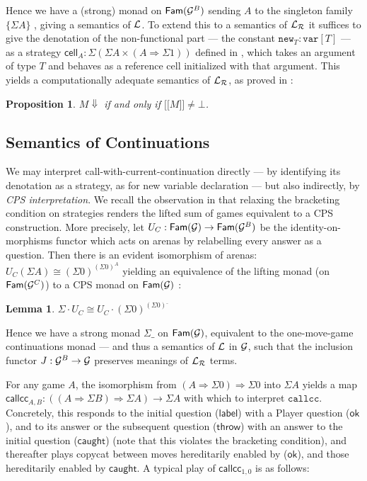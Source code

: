 \documentclass{eptcs}
\def\[{\ensuremath{[ \! [}}
\def\]{\ensuremath{] \! ]}}
\def\G{{\cal{G}}}
\def\L{{\cal{L}}}
\def\0{0}
\def\1m{\iota}
\def\1{1}
\newcommand{\lbl}{{\mathsf{label}}}
\newcommand{\ok}{{\mathsf{ok}}}
\newcommand{\caught}{{\mathsf{caught}}}
\newcommand{\callcc}{{\mathtt{callcc}}}
\newcommand{\Lr}{{\cal{L_R}}}
\newcommand{\var}{{\mathtt{var}}}
\newcommand{\callc}{{\mathsf{callcc}}}
\newcommand{\new}{{\mathtt{new}}}
\newcommand{\cell}{{\mathsf{cell}}}
\newcommand{\Fam}{{\mathsf{Fam}}}
\newtheorem{lemma}[theorem]{Lemma}
\newtheorem{proposition}[theorem]{Proposition}
\begin{document}
Hence we have a (strong) monad on  $\Fam(\G^B)$ sending $A$ to the singleton family $\{\Sigma A\}$ \cite{AMV}, giving a semantics of $\L$. To extend this to a semantics of $\Lr$ it suffices to give the denotation of the non-functional part --- the  constant $\new_T: \var[T]$ --- as a  strategy
 $\cell_{A}:\Sigma(\Sigma A \times (A \Rightarrow \Sigma\1))$ defined in \cite{AHM}, which takes an argument of type $T$ and behaves as a reference cell initialized with that argument. This yields a computationally adequate semantics of $\Lr$, as proved in \cite{AHM}:
\begin{proposition}$M \Downarrow$ if and only if $\[M\] \not = \bot$. \end{proposition}
\subsection{Semantics of Continuations}
We may interpret call-with-current-continuation directly --- by identifying its denotation as a strategy, as  for new variable declaration --- but also indirectly, by \emph{CPS interpretation}. We recall the observation in \cite{LT} that relaxing the bracketing condition on strategies renders the lifted sum of games equivalent to a CPS construction. More precisely,  let   $U_C:\Fam(\G) \rightarrow \Fam(\G^B)$ be the identity-on-morphisms functor which acts on arenas by relabelling every answer as a question. Then there is an evident isomorphism of arenas: $U_C(\Sigma A) \cong  (\Sigma 0)^{(\Sigma 0)^{A}}$   yielding an equivalence of the lifting monad (on $\Fam(\G^C)$) to a CPS monad on $\Fam(\G)$ :
\begin{lemma}\label{cc} $\Sigma\cdot U_C \cong U_C\cdot (\Sigma 0)^{(\Sigma 0)^{\_}}$
\end{lemma}
Hence we have a strong monad $\Sigma\_$ on $\Fam(\G)$, equivalent to the one-move-game continuations monad --- and thus a semantics of $\L$ in $\G$, such that the inclusion functor $J:\G^B \rightarrow \G$ preserves meanings of $\Lr$ terms. 

For any game $A$, the isomorphism from $(A \Rightarrow \Sigma 0) \Rightarrow \Sigma 0$ into $\Sigma A$ yields a map  $\callc_{A,B}:((A \Rightarrow \Sigma B)   \Rightarrow \Sigma A) \rightarrow  \Sigma A$ with which to interpret $\callcc$. Concretely, this responds to the initial question ($\lbl$) with a  Player question ($\ok$),  and to its answer or the  subsequent question (${\mathsf{throw}}$)  with an answer to the initial question ($\caught$)  (note that this violates the bracketing condition), and  thereafter plays copycat between moves hereditarily enabled by  ($\ok$), and those hereditarily enabled by $\caught$. A typical play of $\callc_{\1,\0}$ is as follows: 
\end{document}
